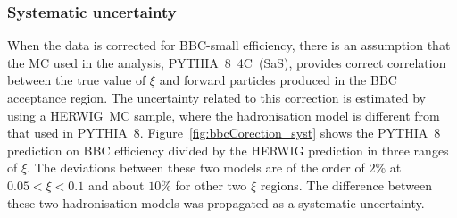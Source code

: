 \subsubsection{Systematic uncertainty}
When the data is corrected for BBC-small efficiency, there is an assumption that the MC used in the analysis, PYTHIA~8~4C~(SaS), provides correct correlation between the true value of $\xi$ and forward particles produced in the BBC acceptance region.  The uncertainty related to this correction is  estimated by using a HERWIG~MC sample, where the hadronisation model is different from that used in PYTHIA~8. Figure~\ref{fig:bbcCorection_syst} shows the PYTHIA~8  prediction on BBC efficiency  divided by the HERWIG prediction in three ranges of $\xi$. The deviations between these two models are of the order of $2\%$ at $0.05<\xi<0.1$ and about $10\%$ for  other two $\xi$ regions. The difference between these two hadronisation models was propagated as a systematic uncertainty.
